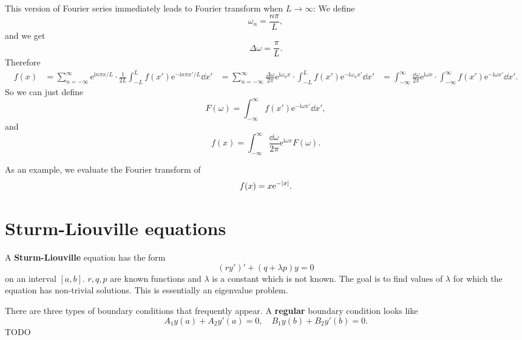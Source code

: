 \documentclass[hyperref, a4paper]{article}
\newcommand*{\ii}{\mathrm{i}}
\newcommand*{\ee}{\mathrm{e}}
\newcommand*{\concept}[1]{{\textbf{#1}}}
\def\\{}%
\begin{document}
This version of Fourier series immediately leads to Fourier transform when $L \to \infty$:
We define 
\begin{equation}
    \omega_n = \frac{n \pi}{L}, 
\end{equation}
and we get 
\begin{equation}
    \Delta \omega = \frac{\pi}{L}.
\end{equation}
Therefore 
\[
    \begin{aligned}
        f(x) &= \sum_{n=-\infty}^{\infty} \ee^{\ii n \pi x / L} \cdot \frac{1}{2L} 
            \int_{-L}^{L} f(x') \ee^{- \ii n \pi x' / L} \dd{x'} \\
            &= \sum_{n=-\infty}^{\infty} \frac{\Delta \omega}{2\pi} \ee^{\ii \omega_n x} \cdot  
            \int_{-L}^{L} f(x') \ee^{- \ii \omega_n x' } \dd{x'} \\
            &= \int_{-\infty}^{\infty} \frac{\dd{\omega}}{2\pi} \ee^{\ii \omega x} \cdot 
            \int_{-\infty}^{\infty} f(x') \ee^{- \ii \omega x'} \dd{x'}.
    \end{aligned}
\]
So we can just define 
\begin{equation}
    F(\omega) = \int_{-\infty}^{\infty} f(x') \ee^{- \ii \omega x'} \dd{x'},
\end{equation}
and 
\begin{equation}
    f(x) =\int_{-\infty}^{\infty} \frac{\dd{\omega}}{2\pi} \ee^{\ii \omega x} F(\omega).
\end{equation}

As an example, we evaluate the Fourier transform of 
\begin{equation}
    f(x) = x \ee^{- \abs*{x}}.
\end{equation}

\section{Sturm-Liouville equations}

A \concept{Sturm-Liouville} equation has the form 
\begin{equation}
    (ry')' + (q + \lambda p) y = 0
    \label{eq:sl.scheme}
\end{equation}
on an interval $[a, b]$. 
$r, q, p$ are known functions and $\lambda$ is a constant which is not known.
The goal is to find values of $\lambda$ 
for which the equation has non-trivial solutions.
This is essentially an eigenvalue problem. 

There are three types of boundary conditions that frequently appear. 
A \concept{regular} boundary condition looks like 
\begin{equation}
    A_1 y(a) + A_2 y'(a) = 0, \quad 
    B_1 y(b) + B_2 y'(b) = 0.
\end{equation}
TODO 
\end{document}
